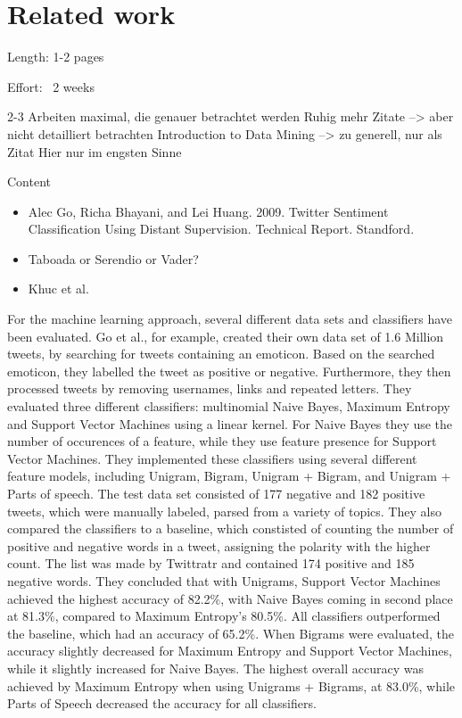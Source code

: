 \chapter{Related work}
\label{cha:Chapter2_RelatedWork}

Length: 1-2 pages

Effort: ~2 weeks

2-3 Arbeiten maximal, die genauer betrachtet werden
Ruhig mehr Zitate --> aber nicht detailliert betrachten
Introduction to Data Mining --> zu generell, nur als Zitat
Hier nur im engsten Sinne


Content
\begin{itemize}
\item Alec Go, Richa Bhayani, and Lei Huang. 2009. Twitter Sentiment Classification Using Distant Supervision.
Technical Report. Standford.
\item Taboada or Serendio or Vader?
\item Khuc et al.
\end{itemize}


For the machine learning approach, several different data sets and classifiers have been evaluated. Go et al., for example, created their own data set of 1.6 Million tweets, by searching for tweets containing an emoticon. Based on the searched emoticon, they labelled the tweet as positive or negative. Furthermore, they then processed tweets by removing usernames, links and repeated letters. They evaluated three different classifiers: multinomial Naive Bayes, Maximum Entropy and Support Vector Machines using a linear kernel. For Naive Bayes  they use the number of occurences of a feature, while they use feature presence for Support Vector Machines. They implemented these classifiers using several different feature models, including Unigram, Bigram, Unigram + Bigram, and Unigram + Parts of speech. The test data set consisted of 177 negative and 182 positive tweets, which were manually labeled, parsed from a variety of topics. They also compared the classifiers to a baseline, which constisted of counting the number of positive and negative words in a tweet, assigning the polarity with the higher count. The list was made by Twittratr and contained 174 positive and 185 negative words. They concluded that with Unigrams, Support Vector Machines achieved the highest accuracy of 82.2\%, with Naive Bayes coming in second place at 81.3\%, compared to Maximum Entropy's 80.5\%. All classifiers outperformed the baseline, which had an accuracy of 65.2\%. When Bigrams were evaluated, the accuracy slightly decreased for Maximum Entropy and Support Vector Machines, while it slightly increased for Naive Bayes. The highest overall accuracy was achieved by Maximum Entropy when using Unigrams + Bigrams, at 83.0\%, while Parts of Speech decreased the accuracy for all classifiers.







